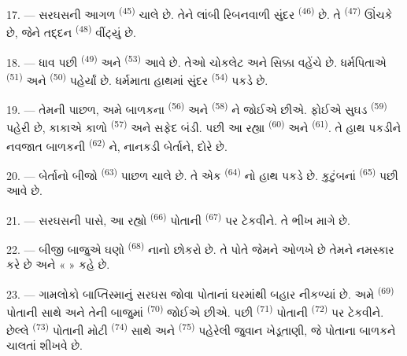 \VUsaut{5.0mm}
\VUsaut{4.0mm}

17. --- સરઘસની આગળ  \textsuperscript{(45)} ચાલે છે. તેને
લાંબી રિબનવાળી સુંદર  \textsuperscript{(46)} છે. તે
 \textsuperscript{(47)} ઊંચકે છે, જેને તદ્દન
 \textsuperscript{(48)} વીંટ્યું છે.

18. --- ધાવ પછી  \textsuperscript{(49)} અને
 \textsuperscript{(53)} આવે છે. તેઓ ચોકલેટ અને સિક્કા
વહેંચે છે. ધર્મપિતાએ  \textsuperscript{(51)} અને
 \textsuperscript{(50)} પહેર્યાં છે. ધર્મમાતા હાથમાં
સુંદર  \textsuperscript{(54)} પકડે છે.

19. --- તેમની પાછળ, અમે બાળકના  \textsuperscript{(56)}
અને  \textsuperscript{(58)} ને જોઈએ છીએ. ફોઈએ સુઘડ
 \textsuperscript{(59)} પહેરી છે, કાકાએ કાળો
 \textsuperscript{(57)} અને સફેદ બંડી. પછી આ રહ્યા
 \textsuperscript{(60)} અને 
\textsuperscript{(61)}. તે હાથ પકડીને નવજાત બાળકની 
\textsuperscript{(62)} ને, નાનકડી બેર્તાને, દોરે છે.

20. --- બેર્તાનો બીજો  \textsuperscript{(63)} પાછળ ચાલે છે.
તે એક  \textsuperscript{(64)} નો હાથ પકડે છે. કુટુંબનાં
 \textsuperscript{(65)} પછી આવે છે.

\VUsaut{4.6mm}
\VUsaut{3.4mm}

21. --- સરઘસની પાસે, આ રહ્યો  \textsuperscript{(66)}
પોતાની  \textsuperscript{(67)} પર ટેકવીને. તે ભીખ માગે છે.

22. --- બીજી બાજુએ ઘણો  \textsuperscript{(68)} નાનો
છોકરો છે. તે પોતે જેમને ઓળખે છે તેમને નમસ્કાર કરે છે અને
«  » કહે છે.

23. --- ગામલોકો બાપ્તિસ્માનું સરઘસ જોવા પોતાનાં ઘરમાંથી બહાર નીકળ્યાં
છે. અમે  \textsuperscript{(69)} પોતાની  સાથે અને તેની બાજુમાં  \textsuperscript{(70)}
જોઈએ છીએ. પછી  \textsuperscript{(71)} પોતાની
 \textsuperscript{(72)} પર ટેકવીને. છેલ્લે 
\textsuperscript{(73)} પોતાની મોટી 
\textsuperscript{(74)} સાથે અને 
\textsuperscript{(75)} પહેરેલી જુવાન ખેડૂતાણી, જે પોતાના બાળકને ચાલતાં
શીખવે છે.

